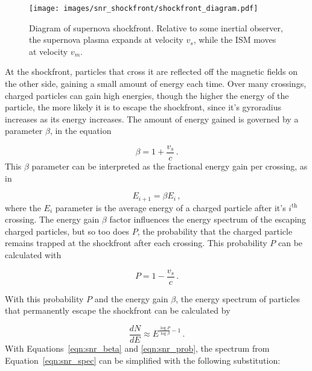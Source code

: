   \begin{figure}[!t]
    \centering
    \texttt{[image: images/snr\_shockfront/shockfront\_diagram.pdf]}
    \caption[Supernova Shockfront]{
      Diagram of supernova shockfront.
      Relative to some inertial observer, the supernova plasma expands at velocity $v_s$, while the ISM moves at velocity $v_m$.
    }
    \label{fig:snr_shockfront}
  \end{figure}
  
  At the shockfront, particles that cross it are reflected off the magnetic fields on the other side, gaining a small amount of energy each time.
  Over many crossings, charged particles can gain high energies, though the higher the energy of the particle, the more likely it is to escape the shockfront, since it's gyroradius increases as its energy increases.
  The amount of energy gained is governed by a parameter $\beta$, in the equation
  
  \begin{equation}\label{eqn:snr_beta}
    \beta = 1 + \frac{v_s}{c} \,.
  \end{equation}
  This $\beta$ parameter can be interpreted as the fractional energy gain per crossing, as in

  \begin{equation}\label{eqn:snr_beta_en}
    E_{i+1} = \beta E_{i} \,,
  \end{equation}
  where the $E_i$ parameter is the average energy of a charged particle after it's $i^{\textrm{th}}$ crossing.
  The energy gain $\beta$ factor influences the energy spectrum of the escaping charged particles, but so too does $P$, the probability that the charged particle remains trapped at the shockfront after each crossing.
  This probability $P$ can be calculated with
  
  \begin{equation}\label{eqn:snr_prob}
    P = 1 - \frac{v_s}{c} \,.
  \end{equation}

  With this probability $P$ and the energy gain $\beta$, the energy spectrum of particles that permanently escape the shockfront can be calculated by
  
  \begin{equation}\label{eqn:snr_spec}
    \frac{dN}{dE} \approx E^{ \frac{\log P}{\log \beta} - 1 } \,.
  \end{equation}
  With Equations~\ref{eqn:snr_beta} and \ref{eqn:snr_prob}, the spectrum from Equation~\ref{eqn:snr_spec} can be simplified with the following substitution:

